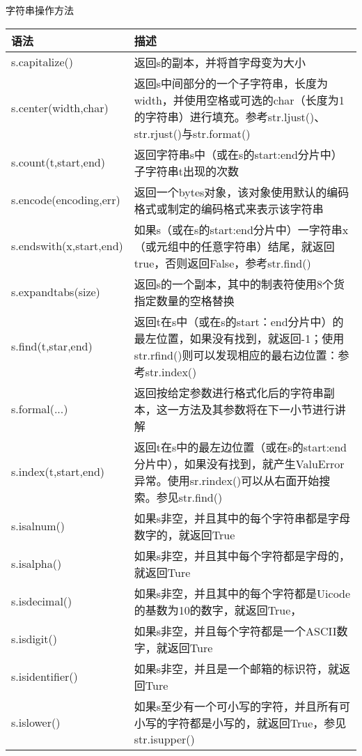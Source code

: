 \begin{frame}{字符串操作方法}
  \begin{center}
    \scriptsize
    \begin{longtable}{p{} | p{}}
      \toprule
      语法 & 描述 \\ 
      \midrule
      s.capitalize() & 返回s的副本，并将首字母变为大小 \\ \hline
      s.center(width,char) & 返回s中间部分的一个子字符串，长度为width，并使用空格或可选的char（长度为1的字符串）进行填充。参考str.ljust()、str.rjust()与str.format() \\ \hline
      s.count(t,start,end) & 返回字符串s中（或在s的start:end分片中）子字符串t出现的次数 \\ \hline
      s.encode(encoding,err) & 返回一个bytes对象，该对象使用默认的编码格式或制定的编码格式来表示该字符串 \\ \hline
      s.endswith(x,start,end) & 如果s（或在s的start:end分片中）一字符串x（或元组中的任意字符串）结尾，就返回true，否则返回False，参考str.find() \\ \hline
      s.expandtabs(size) & 返回s的一个副本，其中的制表符使用8个货指定数量的空格替换 \\ \hline
      s.find(t,star,end) & 返回t在s中（或在s的start：end分片中）的最左位置，如果没有找到，就返回-1；使用str.rfind()则可以发现相应的最右边位置：参考str.index() \\ \hline
      s.formal(...) & 返回按给定参数进行格式化后的字符串副本，这一方法及其参数将在下一小节进行讲解 \\ \hline
      s.index(t,start,end) & 返回t在s中的最左边位置（或在s的start:end分片中），如果没有找到，就产生ValuError异常。使用sr.rindex()可以从右面开始搜索。参见str.find() \\ \hline
      s.isalnum() & 如果s非空，并且其中的每个字符串都是字母数字的，就返回True \\ \hline
      s.isalpha() & 如果s非空，并且其中每个字符都是字母的，就返回Ture \\ \hline
      s.isdecimal() & 如果s非空，并且其中的每个字符都是Uicode的基数为10的数字，就返回True， \\ \hline
      s.isdigit() & 如果s非空，并且每个字符都是一个ASCII数字，就返回Ture \\ \hline
      s.isidentifier() & 如果s非空，并且是一个邮箱的标识符，就返回Ture \\ \hline
      s.islower() & 如果s至少有一个可小写的字符，并且所有可小写的字符都是小写的，就返回True，参见str.isupper() \\ \hline

\end{longtable}
\end{center}
\end{frame}
